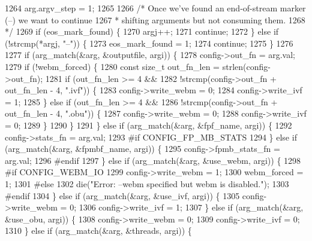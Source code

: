 \begin{DoxyCodeInclude}
{{{{{{{{{{{{{{{{1264     arg.argv\_step = 1;
1265 
1266     \textcolor{comment}{/* Once we've found an end-of-stream marker (--) we want to continue}
1267 \textcolor{comment}{     * shifting arguments but not consuming them.}
1268 \textcolor{comment}{     */}
1269     \textcolor{keywordflow}{if} (eos\_mark\_found) \{
1270       argj++;
1271       \textcolor{keywordflow}{continue};
1272     \} \textcolor{keywordflow}{else} \textcolor{keywordflow}{if} (!strcmp(*argj, \textcolor{stringliteral}{"--"})) \{
1273       eos\_mark\_found = 1;
1274       \textcolor{keywordflow}{continue};
1275     \}
1276 
1277     \textcolor{keywordflow}{if} (arg\_match(&arg, &outputfile, argi)) \{
1278       config->out\_fn = arg.val;
1279       \textcolor{keywordflow}{if} (!webm\_forced) \{
1280         \textcolor{keyword}{const} \textcolor{keywordtype}{size\_t} out\_fn\_len = strlen(config->out\_fn);
1281         \textcolor{keywordflow}{if} (out\_fn\_len >= 4 &&
1282             !strcmp(config->out\_fn + out\_fn\_len - 4, \textcolor{stringliteral}{".ivf"})) \{
1283           config->write\_webm = 0;
1284           config->write\_ivf = 1;
1285         \} \textcolor{keywordflow}{else} \textcolor{keywordflow}{if} (out\_fn\_len >= 4 &&
1286                    !strcmp(config->out\_fn + out\_fn\_len - 4, \textcolor{stringliteral}{".obu"})) \{
1287           config->write\_webm = 0;
1288           config->write\_ivf = 0;
1289         \}
1290       \}
1291     \} \textcolor{keywordflow}{else} \textcolor{keywordflow}{if} (arg\_match(&arg, &fpf\_name, argi)) \{
1292       config->stats\_fn = arg.val;
1293 \textcolor{preprocessor}{#if CONFIG\_FP\_MB\_STATS}
1294     \} \textcolor{keywordflow}{else} \textcolor{keywordflow}{if} (arg\_match(&arg, &fpmbf\_name, argi)) \{
1295       config->fpmb\_stats\_fn = arg.val;
1296 \textcolor{preprocessor}{#endif}
1297     \} \textcolor{keywordflow}{else} \textcolor{keywordflow}{if} (arg\_match(&arg, &use\_webm, argi)) \{
1298 \textcolor{preprocessor}{#if CONFIG\_WEBM\_IO}
1299       config->write\_webm = 1;
1300       webm\_forced = 1;
1301 \textcolor{preprocessor}{#else}
1302       die(\textcolor{stringliteral}{"Error: --webm specified but webm is disabled."});
1303 \textcolor{preprocessor}{#endif}
1304     \} \textcolor{keywordflow}{else} \textcolor{keywordflow}{if} (arg\_match(&arg, &use\_ivf, argi)) \{
1305       config->write\_webm = 0;
1306       config->write\_ivf = 1;
1307     \} \textcolor{keywordflow}{else} \textcolor{keywordflow}{if} (arg\_match(&arg, &use\_obu, argi)) \{
1308       config->write\_webm = 0;
1309       config->write\_ivf = 0;
1310     \} \textcolor{keywordflow}{else} \textcolor{keywordflow}{if} (arg\_match(&arg, &threads, argi)) \{
}}}}}}}}}}}}}}}}
\end{DoxyCodeInclude}
